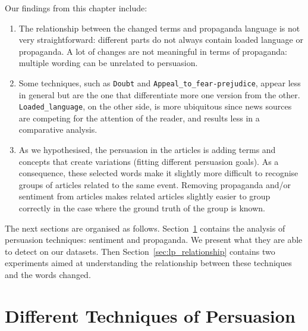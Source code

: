 Our findings from this chapter include:
\begin{enumerate}
    \item The relationship between the changed terms and propaganda language is not very straightforward: different parts do not always contain loaded language or propaganda. A lot of changes are not meaningful in terms of propaganda: multiple wording can be unrelated to persuasion. %
    \item Some techniques, such as \texttt{Doubt} and \texttt{Appeal\_to\_fear-prejudice}, appear less in general but are the one that differentiate more one version from the other. \texttt{Loaded\_language}, on the other side, is more ubiquitous since news sources are competing for the attention of the reader, and results less in a comparative analysis.
    \item As we hypothesised, the persuasion in the articles is adding terms and concepts that create variations (fitting different persuasion goals). As a consequence, these selected words make it slightly more difficult to recognise groups of articles related to the same event.
    Removing propaganda and/or sentiment from articles makes related articles slightly easier to group correctly in the case where the ground truth of the group is known.%
\end{enumerate}


The next sections are organised as follows. Section~\ref{sec:lp_techniques} contains the analysis of persuasion techniques: sentiment and propaganda.
We present what they are able to detect on our datasets. %
Then Section~\ref{sec:lp_relationship} contains two experiments aimed at understanding the relationship between these techniques and the words changed.%

\section{Different Techniques of Persuasion}
\label{sec:lp_techniques}

